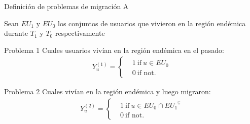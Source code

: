 \documentclass[xcolor=x11names]{beamer}
\begin{document}

\begin{frame}{Definición de problemas de migración A}

	Sean $EU_{1}$ y $EU_{0}$ los conjuntos de usuarios que vivieron en la región endémica durante $T_1$ y $T_0$ respectivamente
	\begin{block}{Problema 1}
	Cuales usuarios vivían en la región endémica en el pasado:
		\begin{align*}
		Y^{(1)}_u =
		\begin{cases}
		&1 \ \mbox{if} \ u \in EU_{0} \\
		&0 \ \mbox{if not}.
		\end{cases}
		\end{align*}
	\end{block}


	\begin{block}{Problema 2}
		Cuales vivían en la región endémica y luego migraron:
		\begin{align*}
			Y^{(2)}_u =
			\begin{cases}
				&1 \ \mbox{if} \ u \in EU_{0} \cap { EU_{1} }^{\complement}  \\
				&0 \ \mbox{if not}.
			\end{cases}
		\end{align*}
	\end{block}

\end{frame}

\end{document}
